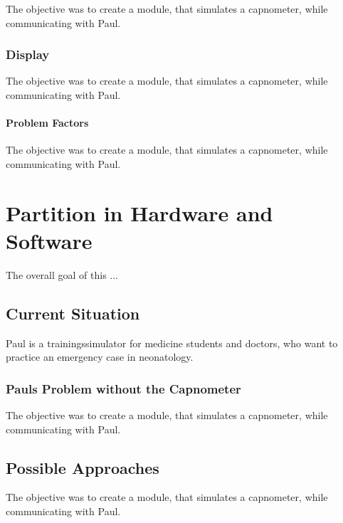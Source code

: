 \documentclass[12pt]{article}
\begin{document}
The objective was to create a module, that simulates a capnometer, while communicating
with Paul.


\subsubsection{Display}

The objective was to create a module, that simulates a capnometer, while communicating
with Paul.


\paragraph{Problem Factors}

The objective was to create a module, that simulates a capnometer, while communicating
with Paul.


\clearpage

\section{Partition in Hardware and Software}

The overall goal of this ...


\subsection{Current Situation}

Paul is a trainingssimulator for medicine students and doctors, who want to practice
an emergency case in neonatology.


\subsubsection{Pauls Problem without the Capnometer}

The objective was to create a module, that simulates a capnometer, while communicating
with Paul.


\subsection{Possible Approaches}

The objective was to create a module, that simulates a capnometer, while communicating
with Paul.
\end{document}
